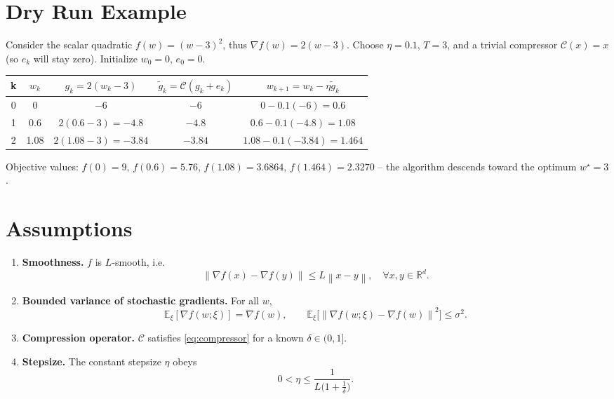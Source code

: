 \documentclass{article}
\newcommand{\E}{\mathbb{E}}
\newcommand{\norm}[1]{\left\|#1\right\|}
\begin{document}
\section*{Dry Run Example}
Consider the scalar quadratic $f(w)=(w-3)^2$, thus $\nabla f(w)=2(w-3)$.  
Choose $\eta=0.1$, $T=3$, and a trivial compressor $\mathcal{C}(x)=x$ (so $e_k$ will stay zero).  
Initialize $w_0=0$, $e_0=0$.

\begin{center}
\begin{tabular}{c|c|c|c|c}
k & $w_k$ & $g_k=2(w_k-3)$ & $\tilde g_k=\mathcal{C}(g_k+e_k)$ & $w_{k+1}=w_k-\eta\tilde g_k$ \\ \hline
0 & 0 & $-6$ & $-6$ & $0-0.1(-6)=0.6$\\
1 & 0.6 & $2(0.6-3)=-4.8$ & $-4.8$ & $0.6-0.1(-4.8)=1.08$\\
2 & 1.08 & $2(1.08-3)=-3.84$ & $-3.84$ & $1.08-0.1(-3.84)=1.464$\\
\end{tabular}
\end{center}
Objective values:
$f(0)=9$, $f(0.6)=5.76$, $f(1.08)=3.6864$, $f(1.464)=2.3270$ – the algorithm descends toward the optimum $w^\star=3$.

\section*{Assumptions}
\label{sec:assumptions}
\begin{enumerate}
    \item \textbf{Smoothness.} $f$ is $L$‑smooth, i.e.
    \begin{equation}
        \norm{\nabla f(x)-\nabla f(y)}\le L\norm{x-y},\quad\forall x,y\in\mathbb{R}^d .
        \label{def:smooth}
    \end{equation}
    \item \textbf{Bounded variance of stochastic gradients.} For all $w$,
    \begin{equation}
        \E_{\xi}[\nabla f(w;\xi)]=\nabla f(w),\qquad
        \E_{\xi}\big[\norm{\nabla f(w;\xi)-\nabla f(w)}^2\big]\le\sigma^2 .
        \label{assump:variance}
    \end{equation}
    \item \textbf{Compression operator.} $\mathcal{C}$ satisfies \eqref{eq:compressor} for a known $\delta\in(0,1]$.
    \item \textbf{Stepsize.} The constant stepsize $\eta$ obeys
    \begin{equation}
        0<\eta\le \frac{1}{L\big(1+\frac{1}{\delta}\big)} .
        \label{eq:stepsize}
    \end{equation}
\end{enumerate}
\end{document}
